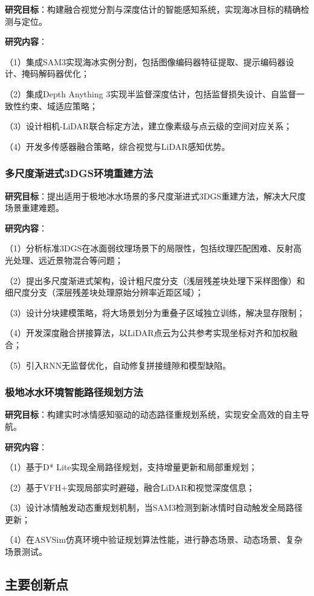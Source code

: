 \documentclass[12pt,a4paper]{ctexbook}
\begin{document}
\textbf{研究目标}：构建融合视觉分割与深度估计的智能感知系统，实现海冰目标的精确检测与定位。

\textbf{研究内容}：

（1）集成SAM3实现海冰实例分割，包括图像编码器特征提取、提示编码器设计、掩码解码器优化；

（2）集成Depth Anything 3实现半监督深度估计，包括监督损失设计、自监督一致性约束、域适应策略；

（3）设计相机-LiDAR联合标定方法，建立像素级与点云级的空间对应关系；

（4）开发多传感器融合策略，综合视觉与LiDAR感知优势。

\subsubsection{多尺度渐进式3DGS环境重建方法}

\textbf{研究目标}：提出适用于极地冰水场景的多尺度渐进式3DGS重建方法，解决大尺度场景重建难题。

\textbf{研究内容}：

（1）分析标准3DGS在冰面弱纹理场景下的局限性，包括纹理匹配困难、反射高光处理、远近景物混合等问题；

（2）提出多尺度渐进式架构，设计粗尺度分支（浅层残差块处理下采样图像）和细尺度分支（深层残差块处理原始分辨率近距区域）；

（3）设计分块建模策略，将大场景划分为重叠子区域独立训练，解决显存限制；

（4）开发深度融合拼接算法，以LiDAR点云为公共参考实现坐标对齐和加权融合；

（5）引入RNN无监督优化，自动修复拼接缝隙和模型缺陷。

\subsubsection{极地冰水环境智能路径规划方法}

\textbf{研究目标}：构建实时冰情感知驱动的动态路径重规划系统，实现安全高效的自主导航。

\textbf{研究内容}：

（1）基于D* Lite实现全局路径规划，支持增量更新和局部重规划；

（2）基于VFH+实现局部实时避碰，融合LiDAR和视觉深度信息；

（3）设计冰情触发动态重规划机制，当SAM3检测到新冰情时自动触发全局路径更新；

（4）在ASVSim仿真环境中验证规划算法性能，进行静态场景、动态场景、复杂场景测试。

\subsection{主要创新点}
\end{document}
